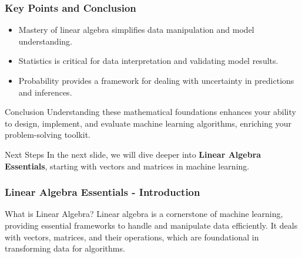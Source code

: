 \documentclass{beamer}
\begin{document}
\begin{frame}[fragile]
    \frametitle{Key Points and Conclusion}
    
    \begin{itemize}
        \item Mastery of linear algebra simplifies data manipulation and model understanding.
        \item Statistics is critical for data interpretation and validating model results.
        \item Probability provides a framework for dealing with uncertainty in predictions and inferences.
    \end{itemize}
    
    \begin{block}{Conclusion}
        Understanding these mathematical foundations enhances your ability to design, implement, and evaluate machine learning algorithms, enriching your problem-solving toolkit.
    \end{block}
    
    \begin{block}{Next Steps}
        In the next slide, we will dive deeper into \textbf{Linear Algebra Essentials}, starting with vectors and matrices in machine learning.
    \end{block}
\end{frame}

\begin{frame}[fragile]
    \frametitle{Linear Algebra Essentials - Introduction}
    \begin{block}{What is Linear Algebra?}
        Linear algebra is a cornerstone of machine learning, providing essential frameworks to handle and manipulate data efficiently. It deals with vectors, matrices, and their operations, which are foundational in transforming data for algorithms.
    \end{block}
\end{frame}
\end{document}
